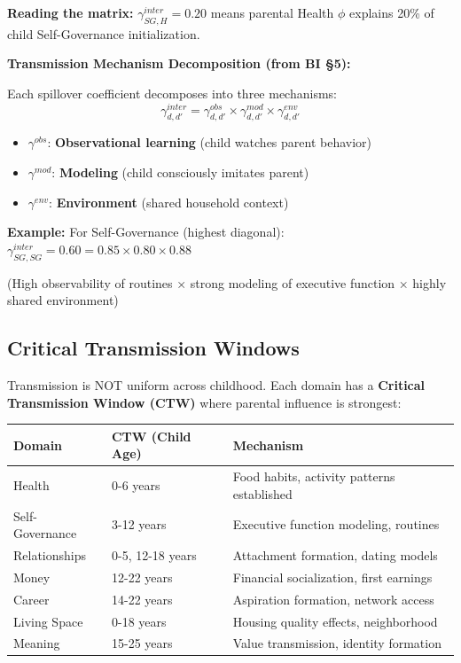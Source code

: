 {{{\textbf{Reading the matrix:} $\gamma^{inter}_{SG,H} = 0.20$ means parental Health $\phi$ explains 20\% of child Self-Governance initialization.

\textbf{Transmission Mechanism Decomposition (from BI §5):}

Each spillover coefficient decomposes into three mechanisms:
\begin{equation}
\gamma^{inter}_{d,d'} = \gamma^{obs}_{d,d'} \times \gamma^{mod}_{d,d'} \times \gamma^{env}_{d,d'}
\end{equation}

\begin{itemize}[nosep]
\item $\gamma^{obs}$: \textbf{Observational learning} (child watches parent behavior)
\item $\gamma^{mod}$: \textbf{Modeling} (child consciously imitates parent)
\item $\gamma^{env}$: \textbf{Environment} (shared household context)
\end{itemize}

\textbf{Example:} For Self-Governance (highest diagonal):
$\gamma^{inter}_{SG,SG} = 0.60 = 0.85 \times 0.80 \times 0.88$

(High observability of routines × strong modeling of executive function × highly shared environment)

\subsection{Critical Transmission Windows}

Transmission is NOT uniform across childhood. Each domain has a \textbf{Critical Transmission Window (CTW)} where parental influence is strongest:

\begin{center}
\small
\begin{tabular}{@{}llp{5cm}@{}}
\toprule
\textbf{Domain} & \textbf{CTW (Child Age)} & \textbf{Mechanism} \\
\midrule
Health & 0-6 years & Food habits, activity patterns established \\
Self-Governance & 3-12 years & Executive function modeling, routines \\
Relationships & 0-5, 12-18 years & Attachment formation, dating models \\
Money & 12-22 years & Financial socialization, first earnings \\
Career & 14-22 years & Aspiration formation, network access \\
Living Space & 0-18 years & Housing quality effects, neighborhood \\
Meaning & 15-25 years & Value transmission, identity formation \\
\bottomrule
\end{tabular}
\end{center}

}}}
